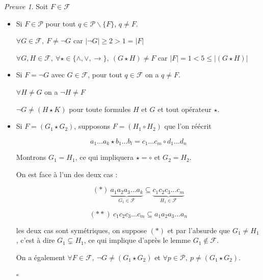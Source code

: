 \documentclass[]{article}
\theoremstyle{remark}
\newtheorem{myproof}{Preuve}
\theoremstyle{definition}
\newcommand{\cqfd}{
	\hfill$\square$
}
\begin{document}
\begin{myproof}
	Soit $F \in \mathcal{F}$
	
	\begin{itemize}
		\item Si $F \in \mathcal{P}$ pour tout $q \in \mathcal{P} \backslash \{F\}$, $q \neq F$.
		
		$\forall G \in \mathcal{F}, ~ F \neq \neg G$ car $|\neg G| \geqslant 2 > 1 = |F|$
		
		$\forall G, H \in \mathcal{F}, ~ \forall \star \in \{\land, \lor, \longrightarrow\}, ~ (G \star H) \neq F$ car $|F| = 1 < 5 \leqslant |(G \star H)|$
		
		\item Si $F=\neg G$ avec $G \in \mathcal{F}$, pour tout $q \in \mathcal{F}$ on a $q \neq F$.
		
		$\forall H \neq G$ on a $\neg H \neq F$
		
		$\neg G \neq (H \star K)$ pour toute formules $H$ et $G$ et tout opérateur $\star$.
		
		\item Si $F=(G_1 \star G_2)$, supposons $F=(H_1 \circ H_2)$ que l'on réécrit
		
		$$a_1...a_k \star b_1...b_l = c_1...c_m \circ d_1...d_n$$
		
		Montrons $G_1 = H_1$, ce qui impliquera $\star = \circ$ et $G_2 = H_2$.
		
		On est face à l'un des deux cas :
		
		$$(*) ~ \underbrace{a_1 a_2 a_3 ...a_k}_{G_1 \in \mathcal{F}} \subseteq \underbrace{c_1 c_2 c_3 ...c_m}_{H_1 \in \mathcal{F}}$$
		
		$$(**) ~ c_1 c_2 c_3 ...c_m\subseteq a_1 a_2 a_3 ...a_n$$
		
		les deux cas sont symétriques, on suppose $(*)$ et par l'absurde que $G_1 \neq H_1$, c'est à dire $G_1 \subsetneq H_1$, ce qui implique d'après le lemme $G_1 \notin \mathcal{F}$.
		
		On a également $\forall F \in \mathcal{F}, ~ \neg G \neq (G_1 \star G_2)$ et $\forall p \in \mathcal{P}, ~ p \neq (G_1 \star G_2)$.
		
		\cqfd
	\end{itemize}
\end{myproof}
\end{document}
